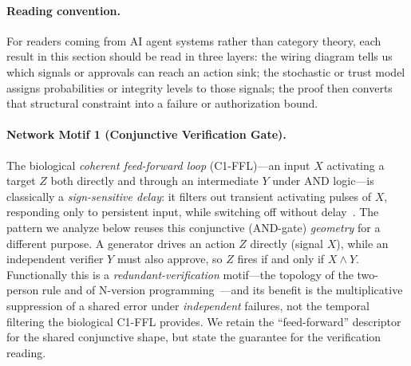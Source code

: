\paragraph{Reading convention.}
For readers coming from AI agent systems rather than category theory, each result in this section should be read in three layers: the wiring diagram tells us which signals or approvals can reach an action sink; the stochastic or trust model assigns probabilities or integrity levels to those signals; the proof then converts that structural constraint into a failure or authorization bound.

\paragraph{Network Motif 1 (Conjunctive Verification Gate).}
The biological \emph{coherent feed-forward loop} (C1-FFL)---an input $X$ activating a target $Z$ both directly
and through an intermediate $Y$ under AND logic---is classically a \emph{sign-sensitive delay}: it filters out
transient activating pulses of $X$, responding only to persistent input, while switching off without
delay~\cite{alon2007network}. The pattern we analyze below reuses this conjunctive (AND-gate) \emph{geometry}
for a different purpose. A generator drives an action $Z$ directly (signal $X$), while an independent verifier
$Y$ must also approve, so $Z$ fires if and only if $X \wedge Y$. Functionally this is a
\emph{redundant-verification} motif---the topology of the two-person rule and of N-version
programming~\cite{knight1986}---and its benefit is the multiplicative suppression of a shared error under
\emph{independent} failures, not the temporal filtering the biological C1-FFL provides. We retain the
``feed-forward'' descriptor for the shared conjunctive shape, but state the guarantee for the verification
reading.

